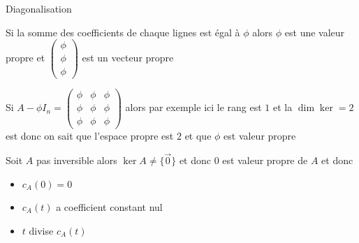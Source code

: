 \begin{parag}{Diagonalisation}
    \begin{truc}
        Si la somme des coefficients de chaque lignes est égal à $\phi$ alors $\phi$ est une valeur propre et $\begin{pmatrix}
            \phi \\ \phi \\ \phi
        \end{pmatrix}$ est un vecteur propre
    \end{truc}
    \begin{truc}
        Si $A - \phi I_n = \begin{pmatrix}
            \phi & \phi & \phi\\
            \phi & \phi & \phi\\
            \phi & \phi & \phi
        \end{pmatrix}$ alors par exemple ici le rang est $1$ et la $\dim \ker = 2$ est donc on sait que l'espace propre est $2$ et que $\phi$ est valeur propre
    \end{truc}
    \begin{truc}
        Soit $A$ pas inversible alors $\ker A \neq \{\vec{0}\}$ et donc $0$ est valeur propre de $A$ et donc \\
        \begin{itemize}
            \item $c_A(0) =0$\\
            \item $c_A(t)$ a coefficient constant nul
            \item $t$ divise $c_A(t)$
        \end{itemize}
    \end{truc}
\end{parag}


